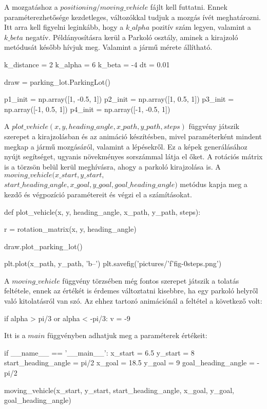 

A mozgatáshoz a $ positioning/moving\_vehicle $ fájlt kell futtatni. Ennek paraméterezhetősége kezdetleges, változókkal tudjuk a mozgás ívét meghatározni. Itt arra kell figyelni leginkább, hogy a $ k\_alpha $ pozitív szám legyen, valamint a $ k\_beta $ negatív. Példányosításra kerül a Parkoló osztály, aminek a kirajzoló metódusát később hívjuk meg. Valamint a jármű mérete állítható.
\begin{python}
k_distance = 2
k_alpha = 6
k_beta = -4
dt = 0.01

draw = parking_lot.ParkingLot()

p1_init = np.array([1, -0.5, 1])
p2_init = np.array([1, 0.5, 1])
p3_init = np.array([-1, 0.5, 1])
p4_init = np.array([-1, -0.5, 1])
\end{python}
A $ plot\_vehicle(x, y, heading\_angle, x\_path, y\_path, steps) $ függvény játszik szerepet a kirajzolásban és az animáció készítésben,  mivel paraméterként mindent megkap a jármű mozgásáról, valamint a lépésekről. Ez a képek generálásához nyújt segítséget, ugyanis növekményes sorszámmal látja el őket. A rotációs mátrix is a törzsön belül kerül meghívásra, ahogy a parkoló kirajzolása is. A $ moving\_vehicle(x\_start, y\_start,$ \\ $start\_heading\_angle, x\_goal, y\_goal, goal\_heading\_angle) $ metódus kapja meg a kezdő és végpozíció paramétereit és végzi el a számításokat. 
\begin{python}
def plot_vehicle(x, y, heading_angle, x_path, y_path, steps):
	
    r = rotation_matrix(x, y, heading_angle)
	
    draw.plot_parking_lot()
	
    plt.plot(x_path, y_path, 'b--')
    plt.savefig('pictures/'f'fig-0{steps}.png')
\end{python}
A $ moving\_vehicle $ függvény törzsében még fontos szerepet játszik a tolatás feltétele, ennek az értékét is érdemes változtatni kisebbre, ha egy parkoló helyről való kitolatásról van szó. Az ehhez tartozó animációnál a feltétel a következő volt:
\begin{python}
if alpha > pi/3 or alpha < -pi/3:
      v = -9
\end{python}
Itt is a $ main $ függvényben adhatjuk meg a paraméterek értékeit:
\begin{python}
if __name__ == '__main__':
    x_start = 6.5
    y_start = 8
    start_heading_angle = pi/2
    x_goal = 18.5
    y_goal = 9
    goal_heading_angle = -pi/2

    moving_vehicle(x_start, y_start, start_heading_angle,
        x_goal, y_goal, goal_heading_angle)
\end{python}
